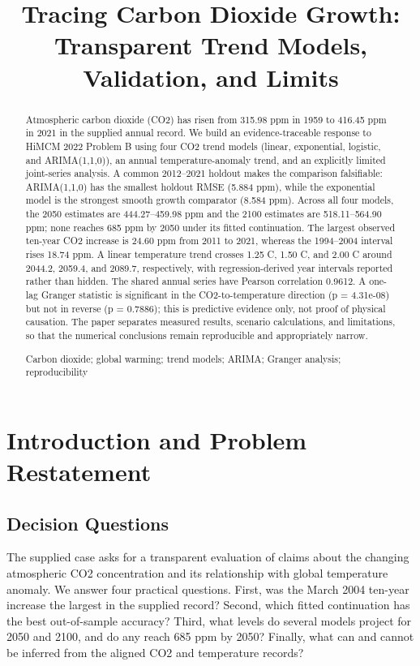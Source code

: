 \documentclass{mcmthesis}
\title{Tracing Carbon Dioxide Growth: Transparent Trend Models, Validation, and Limits}
\begin{document}
\begin{abstract}
Atmospheric carbon dioxide (CO2) has risen from 315.98 ppm in 1959 to 416.45 ppm in 2021 in the supplied annual record. We build an evidence-traceable response to HiMCM 2022 Problem B using four CO2 trend models (linear, exponential, logistic, and ARIMA(1,1,0)), an annual temperature-anomaly trend, and an explicitly limited joint-series analysis. A common 2012--2021 holdout makes the comparison falsifiable: ARIMA(1,1,0) has the smallest holdout RMSE (5.884 ppm), while the exponential model is the strongest smooth growth comparator (8.584 ppm). Across all four models, the 2050 estimates are 444.27--459.98 ppm and the 2100 estimates are 518.11--564.90 ppm; none reaches 685 ppm by 2050 under its fitted continuation. The largest observed ten-year CO2 increase is 24.60 ppm from 2011 to 2021, whereas the 1994--2004 interval rises 18.74 ppm. A linear temperature trend crosses 1.25 C, 1.50 C, and 2.00 C around 2044.2, 2059.4, and 2089.7, respectively, with regression-derived year intervals reported rather than hidden. The shared annual series have Pearson correlation 0.9612. A one-lag Granger statistic is significant in the CO2-to-temperature direction (p = 4.31e-08) but not in reverse (p = 0.7886); this is predictive evidence only, not proof of physical causation. The paper separates measured results, scenario calculations, and limitations, so that the numerical conclusions remain reproducible and appropriately narrow.
\begin{keywords}
Carbon dioxide; global warming; trend models; ARIMA; Granger analysis; reproducibility
\end{keywords}
\end{abstract}
\maketitle
\tableofcontents
\newpage

\section{Introduction and Problem Restatement}
\subsection{Decision Questions}
The supplied case asks for a transparent evaluation of claims about the changing atmospheric CO2 concentration and its relationship with global temperature anomaly. We answer four practical questions. First, was the March 2004 ten-year increase the largest in the supplied record? Second, which fitted continuation has the best out-of-sample accuracy? Third, what levels do several models project for 2050 and 2100, and do any reach 685 ppm by 2050? Finally, what can and cannot be inferred from the aligned CO2 and temperature records?
\end{document}
